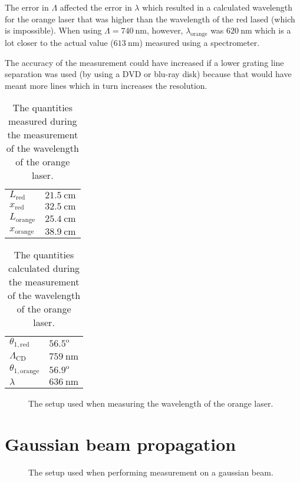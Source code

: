 \documentclass[12pt,a4paper]{article}
\begin{document}
The error in $\Lambda$ affected the error in $\lambda$ which resulted in a calculated wavelength for the orange laser that was higher than the wavelength of the red lased (which is impossible). When using $\Lambda=\SI{740}{\nano\metre}$, however, $\lambda_\text{orange}$ was $\SI{620}{\nano\metre}$ which is a lot closer to the actual value ($\SI{613}{\nano\metre}$) measured using a spectrometer.

The accuracy of the measurement could have increased if a lower grating line separation was used (by using a DVD or blu-ray disk) because that would have meant more lines which in turn increases the resolution.
\begin{table}
  \centering
  \begin{tabular}{|l|l|}\hline
    $L_\text{red}$ & $\SI{21.5}{\centi\metre}$ \\
    $x_\text{red}$ & $\SI{32.5}{\centi\metre}$ \\
    $L_\text{orange}$ & $\SI{25.4}{\centi\metre}$ \\
    $x_\text{orange}$ & $\SI{38.9}{\centi\metre}$ \\ \hline
  \end{tabular}
  \caption{The quantities measured during the measurement of the wavelength of the orange laser.}
  \label{tab:diffraction_orange_vals}
\end{table}
\begin{table}
  \centering
  \begin{tabular}{|l|l|}\hline
    $\theta_{1,\text{red}}$ & $56.5^\text{o}$ \\
    $\Lambda_\text{CD}$ & $\SI{759}{\nano\metre}$ \\
    $\theta_{1,\text{orange}}$ & $56.9^\text{o}$ \\
    $\lambda$ & $\SI{636}{\nano\metre}$ \\ \hline
  \end{tabular}
  \caption{The quantities calculated during the measurement of the wavelength of the orange laser.}
  \label{tab:diffraction_orange_calcs}
\end{table}
\begin{figure}
  \centering
  \noindent\makebox[\textwidth]{\scalebox{0.90}{}}
  \caption{The setup used when measuring the wavelength of the orange laser.}
  \label{fig:diffraction_orange}
\end{figure}
\section{Gaussian beam propagation}
\begin{figure}
  \centering
  \noindent\makebox[\textwidth]{\scalebox{0.90}{}}
  \caption{The setup used when performing measurement on a gaussian beam.}
  \label{fig:diffraction_orange}
\end{figure}
\end{document}
